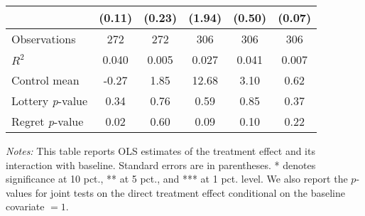 \begin{table}[htbp]
{\begin{threeparttable}
\begin{tabular}{l*{5}{c}}
                &   (0.11)         &   (0.23)         &   (1.94)         &   (0.50)         &   (0.07)         \\
\midrule
Observations    &      272         &      272         &      306         &      306         &      306         \\
\(R^{2}\)       &    0.040         &    0.005         &    0.027         &    0.041         &    0.007         \\
Control mean    &    -0.27         &     1.85         &    12.68         &     3.10         &     0.62         \\
Lottery \emph{p}-value&     0.34         &     0.76         &     0.59         &     0.85         &     0.37         \\
Regret \emph{p}-value&     0.02         &     0.60         &     0.09         &     0.10         &     0.22         \\
\bottomrule \end{tabular} \begin{tablenotes}[flushleft] \footnotesize \item \emph{Notes:} This table reports OLS estimates of the treatment effect and its interaction with baseline. Standard errors are in parentheses. * denotes significance at 10 pct., ** at 5 pct., and *** at 1 pct. level. We also report the \(p\)-values for joint tests on the direct treatment effect conditional on the baseline covariate $= 1$. \end{tablenotes} \end{threeparttable} } \end{table}
